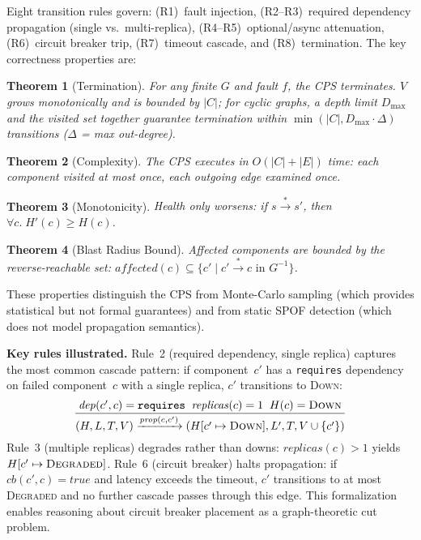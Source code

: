 \documentclass[conference,10pt]{IEEEtran}
\newtheorem{theorem}{Theorem}
\begin{document}
Eight transition rules govern: (R1)~fault injection,
(R2--R3)~required dependency propagation (single vs.\ multi-replica),
(R4--R5)~optional/async attenuation,
(R6)~circuit breaker trip,
(R7)~timeout cascade, and (R8)~termination.
The key correctness properties are:

\begin{theorem}[Termination]\label{thm:term}
For any finite $G$ and fault $f$, the CPS terminates. $V$ grows
monotonically and is bounded by $|C|$; for cyclic graphs, a depth
limit $D_{\max}$ and the visited set together guarantee termination
within $\min(|C|, D_{\max} \cdot \Delta)$ transitions ($\Delta$ =
max out-degree).
\end{theorem}

\begin{theorem}[Complexity]\label{thm:complex}
The CPS executes in $O(|C| + |E|)$ time: each component visited at
most once, each outgoing edge examined once.
\end{theorem}

\begin{theorem}[Monotonicity]\label{thm:mono}
Health only worsens: if $s \xrightarrow{*} s'$, then
$\forall c.\; H'(c) \ge H(c)$.
\end{theorem}

\begin{theorem}[Blast Radius Bound]\label{thm:blast}
Affected components are bounded by the reverse-reachable set:
$\mathit{affected}(c) \subseteq \{c' \mid c' \xrightarrow{*} c
\text{ in } G^{-1}\}$.
\end{theorem}

These properties distinguish the CPS from Monte-Carlo sampling
(which provides statistical but not formal guarantees) and from
static SPOF detection (which does not model propagation semantics).

\textbf{Key rules illustrated.}
Rule~2 (required dependency, single replica) captures the most
common cascade pattern: if component~$c'$ has a \texttt{requires}
dependency on failed component~$c$ with a single replica, $c'$
transitions to \textsc{Down}:
\begin{equation}
  \frac{\mathit{dep}(c', c) = \texttt{requires} \;\;
        \mathit{replicas}(c) = 1 \;\;
        H(c) = \textsc{Down}}
  {(H, L, T, V) \xrightarrow{\textit{prop}(c, c')}
   (H[c' \mapsto \textsc{Down}], L', T, V \cup \{c'\})}
\end{equation}
Rule~3 (multiple replicas) degrades rather than downs:
$\mathit{replicas}(c) > 1$ yields $H[c' \mapsto \textsc{Degraded}]$.
Rule~6 (circuit breaker) halts propagation: if
$\mathit{cb}(c', c) = \mathit{true}$ and latency exceeds the
timeout, $c'$ transitions to at most \textsc{Degraded} and no
further cascade passes through this edge. This formalization
enables reasoning about circuit breaker placement as a
graph-theoretic cut problem.
\end{document}
